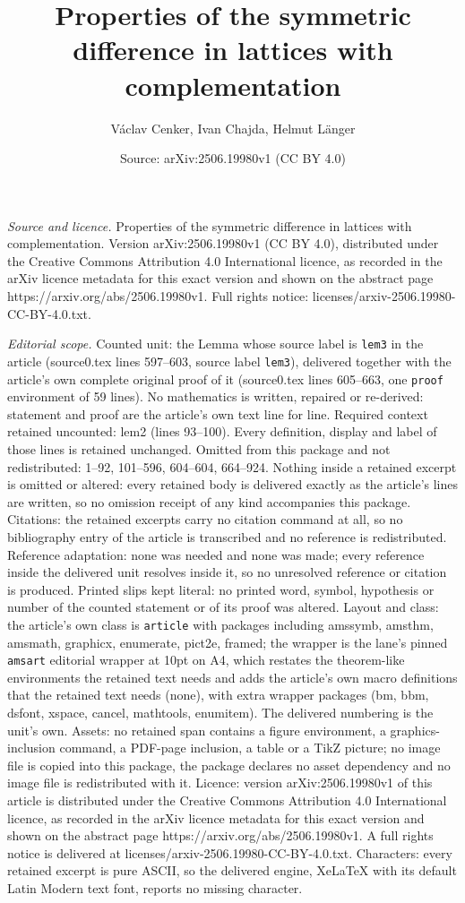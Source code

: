 \documentclass[10pt,a4paper]{amsart}
\title[Properties of the symmetric difference in lattices with comp]{Properties of the symmetric difference in lattices with complementation}
\author{V\'aclav Cenker, Ivan Chajda, Helmut L\"anger}
\date{Source: arXiv:2506.19980v1 (CC BY 4.0)}
\begin{document}
\maketitle

\noindent\emph{Source and licence.} Properties of the symmetric difference in lattices with complementation. Version arXiv:2506.19980v1 (CC BY 4.0), distributed under the Creative Commons Attribution 4.0 International licence, as recorded in the arXiv licence metadata for this exact version and shown on the abstract page https://arxiv.org/abs/2506.19980v1. Full rights notice: licenses/arxiv-2506.19980-CC-BY-4.0.txt.\par\smallskip

\noindent\textit{Editorial scope.} Counted unit: the Lemma whose source label is \texttt{lem3} in the article (source0.tex lines 597--603, source label \texttt{lem3}), delivered together with the article's own complete original proof of it (source0.tex lines 605--663, one \texttt{proof} environment of 59 lines). No mathematics is written, repaired or re-derived: statement and proof are the article's own text line for line. Required context retained uncounted: lem2 (lines 93--100). Every definition, display and label of those lines is retained unchanged. Omitted from this package and not redistributed: 1--92, 101--596, 604--604, 664--924. Nothing inside a retained excerpt is omitted or altered: every retained body is delivered exactly as the article's lines are written, so no omission receipt of any kind accompanies this package. Citations: the retained excerpts carry no citation command at all, so no bibliography entry of the article is transcribed and no reference is redistributed. Reference adaptation: none was needed and none was made; every reference inside the delivered unit resolves inside it, so no unresolved reference or citation is produced. Printed slips kept literal: no printed word, symbol, hypothesis or number of the counted statement or of its proof was altered. Layout and class: the article's own class is \texttt{article} with packages including amssymb, amsthm, amsmath, graphicx, enumerate, pict2e, framed; the wrapper is the lane's pinned \texttt{amsart} editorial wrapper at 10pt on A4, which restates the theorem-like environments the retained text needs and adds the article's own macro definitions that the retained text needs (none), with extra wrapper packages (bm, bbm, dsfont, xspace, cancel, mathtools, enumitem). The delivered numbering is the unit's own. Assets: no retained span contains a figure environment, a graphics-inclusion command, a PDF-page inclusion, a table or a TikZ picture; no image file is copied into this package, the package declares no asset dependency and no image file is redistributed with it. Licence: version arXiv:2506.19980v1 of this article is distributed under the Creative Commons Attribution 4.0 International licence, as recorded in the arXiv licence metadata for this exact version and shown on the abstract page https://arxiv.org/abs/2506.19980v1. A full rights notice is delivered at licenses/arxiv-2506.19980-CC-BY-4.0.txt. Characters: every retained excerpt is pure ASCII, so the delivered engine, XeLaTeX with its default Latin Modern text font, reports no missing character.
\end{document}
